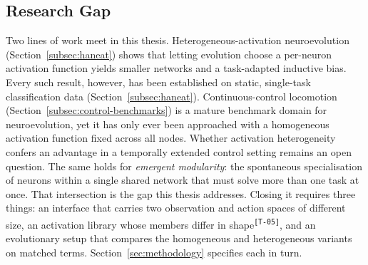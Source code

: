 \documentclass[12pt]{article}
\newcommand{\revID}[1]{\textsuperscript{\scriptsize\texttt{[#1]}}}
\newcommand{\revTerm}[2]{\textcolor{lrTeal}{#2}\revID{#1}}      %
\begin{document}

\subsection{Research Gap}
\label{subsec:research-gap-and-contribution}


Two lines of work meet in this thesis.
Heterogeneous-activation neuroevolution (Section~\ref{subsec:haneat}) shows that letting evolution choose a per-neuron activation function yields smaller networks and a task-adapted inductive bias.
Every such result, however, has been established on static, single-task classification data (Section~\ref{subsec:haneat}).
Continuous-control locomotion (Section~\ref{subsec:control-benchmarks}) is a mature benchmark domain for neuroevolution, yet it has only ever been approached with a homogeneous activation function fixed across all nodes.
Whether activation heterogeneity confers an advantage in a temporally extended control setting remains an open question.
The same holds for \emph{emergent modularity}: the spontaneous specialisation of neurons within a single shared network that must solve more than one task at once.
That intersection is the gap this thesis addresses.
Closing it requires three things: an interface that carries two observation and action spaces of different size, \revTerm{T-05}{an activation library whose members differ in shape}, and an evolutionary setup that compares the homogeneous and heterogeneous variants on matched terms.
Section~\ref{sec:methodology} specifies each in turn.
\end{document}
